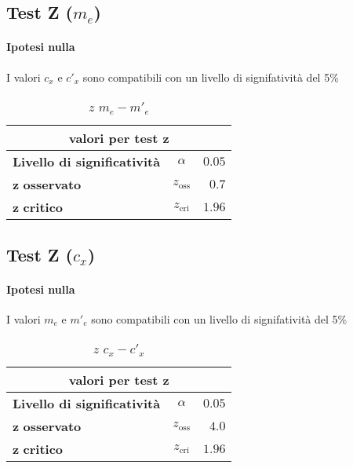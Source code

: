 \documentclass{article}
\begin{document}
\vspace{0.4cm}
\begin{center}
	\begin{minipage}{0.48\textwidth}
		\subsection{Test Z (\(m_{e}\))}
		\paragraph{Ipotesi nulla} I valori \(c_{x}\) e \(c'_{x}\) sono compatibili con un livello di signifatività del 5\%
		\begin{table}[H] \centering
			\begin{small}
				\begin{tabular}{@{}lcr@{}}\toprule
					\multicolumn{3}{c}{\textbf{valori per test} \(\boldsymbol{z}\)}\\ \midrule
					\textbf{Livello di significatività}		 &  \(\alpha\) &\(0.05\) \\  \hdashline
					\(\boldsymbol{z}\) \textbf{osservato}		& \(z_{\text{oss}}\)  &\(0.7\)\\ \hdashline
					\(\boldsymbol{z}\) \textbf{critico}		& \(z_{\text{cri}}\)  &\(1.96\)\\ 
					\bottomrule
				\end{tabular}
			\end{small}
			\caption{\(z\) \(m_{e} - m'_{e}\)}
		\end{table}
	\end{minipage}
	\hspace{0.3cm}
	\begin{minipage}{0.48\textwidth}
		\subsection{Test Z (\(c_{x}\))}
		\paragraph{Ipotesi nulla}  I valori \(m_{e}\) e \(m'_{e}\) sono compatibili con un livello di signifatività del 5\%
		\begin{table}[H] \centering
			\begin{small}
				\begin{tabular}{@{}lcr@{}}\toprule
					\multicolumn{3}{c}{\textbf{valori per test} \(\boldsymbol{z}\)}\\ \midrule
					\textbf{Livello di significatività}		 &  \(\alpha\) &\(0.05\) \\  \hdashline
					\(\boldsymbol{z}\) \textbf{osservato}		& \(z_{\text{oss}}\)  &\(4.0\)\\ \hdashline
					\(\boldsymbol{z}\) \textbf{critico}		& \(z_{\text{cri}}\)  &\(1.96\)\\ 
					\bottomrule
				\end{tabular}
			\end{small}
			\caption{\(z\) \(c_{x} - c'_{x}\)}
		\end{table}
	\end{minipage}
\end{center}
\end{document}
